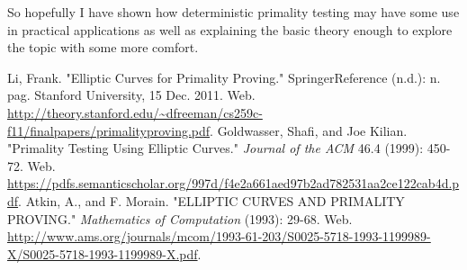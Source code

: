 \documentclass[]{article}
\begin{document}
So hopefully I have shown how deterministic primality testing may have some use in practical applications as well as explaining the basic theory enough to explore the topic with some more comfort.







\begin{thebibliography}{9}

Li, Frank. "Elliptic Curves for Primality Proving." SpringerReference (n.d.): n. pag. Stanford University, 15 Dec. 2011. Web. \url{http://theory.stanford.edu/~dfreeman/cs259c-f11/finalpapers/primalityproving.pdf}.
Goldwasser, Shafi, and Joe Kilian. "Primality Testing Using Elliptic Curves." \emph{Journal of the ACM} 46.4 (1999): 450-72. Web. \url{https://pdfs.semanticscholar.org/997d/f4e2a661aed97b2ad782531aa2ce122cab4d.pdf}.
Atkin, A., and F. Morain. "ELLIPTIC CURVES AND PRIMALITY PROVING." \emph{Mathematics of Computation} (1993): 29-68. Web. \url{http://www.ams.org/journals/mcom/1993-61-203/S0025-5718-1993-1199989-X/S0025-5718-1993-1199989-X.pdf}.

\end{thebibliography}
\end{document}

